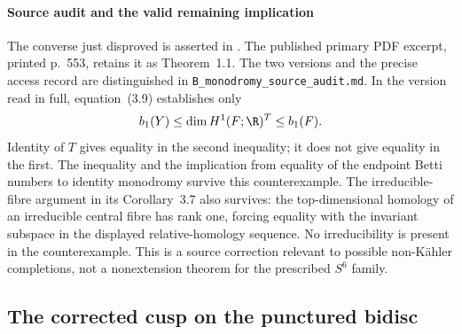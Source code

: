 \paragraph{Source audit and the valid remaining implication}
The converse just disproved is asserted in
\citet[Theorems 1.2 and 3.2, arXiv version~1]{HondaViaclovsky2025D}.
The published primary PDF excerpt, printed p.~553,
retains it as Theorem~1.1.  The two versions and the precise
access record are distinguished in
\texttt{B\_monodromy\_source\_audit.md}.
In the version read in full, equation~(3.9) establishes only
\[
 b_1(Y)\leq\dim H^1(F;\R)^{T}\leq b_1(F).
\]
Identity of $T$ gives equality in the second inequality;
it does not give equality in the first.  The inequality and
the implication from equality of the endpoint Betti numbers
to identity monodromy survive this counterexample.
The irreducible-fibre argument in its Corollary~3.7 also
survives: the top-dimensional homology of an irreducible
central fibre has rank one, forcing equality with the
invariant subspace in the displayed relative-homology
sequence.  No irreducibility is present in the counterexample.
This is a source correction relevant to possible
non-K\"ahler completions, not a nonextension theorem for
the prescribed $S^6$ family.




\subsection{The corrected cusp on the punctured bidisc}

